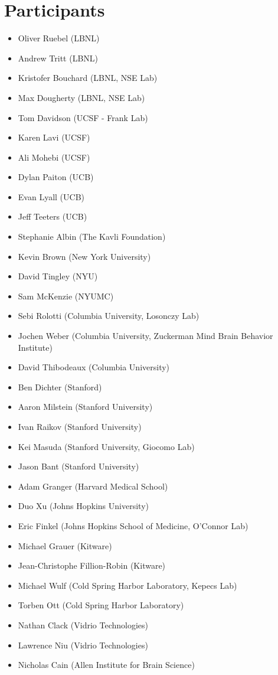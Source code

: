 \documentclass{article}
\begin{document}
\small

\section*{Participants}

\begin{itemize}
\setlength\itemsep{0cm}
\item Oliver Ruebel	(LBNL)
\item Andrew Tritt	(LBNL)
\item Kristofer Bouchard (LBNL, NSE Lab)
\item Max Dougherty (LBNL, NSE Lab)
\item Tom Davidson (UCSF - Frank Lab)
\item Karen Lavi (UCSF)
\item Ali Mohebi	(UCSF)
\item Dylan Paiton (UCB)
\item Evan Lyall (UCB)
\item Jeff Teeters (UCB)
\item Stephanie Albin (The Kavli Foundation)
\item Kevin Brown (New York University)
\item David Tingley (NYU)
\item Sam McKenzie (NYUMC)
\item Sebi Rolotti	(Columbia University, Losonczy Lab)
\item Jochen Weber (Columbia University, Zuckerman Mind Brain Behavior Institute)
\item David Thibodeaux (Columbia University)
\item Ben Dichter	(Stanford)
\item Aaron Milstein (Stanford University)
\item Ivan Raikov	(Stanford University)
\item Kei Masuda (Stanford University, Giocomo Lab)
\item Jason Bant (Stanford University)
\item Adam Granger (Harvard Medical School)
\item Duo Xu (Johns Hopkins University)
\item Eric Finkel (Johns Hopkins School of Medicine, O’Connor Lab)
\item Michael Grauer (Kitware)
\item Jean-Christophe Fillion-Robin (Kitware)
\item Michael Wulf (Cold Spring Harbor Laboratory, Kepecs Lab)
\item Torben Ott (Cold Spring Harbor Laboratory)
\item Nathan Clack (Vidrio Technologies)
\item Lawrence Niu (Vidrio Technologies)
\item Nicholas Cain	(Allen Institute for Brain Science)

\end{itemize}
\end{document}
